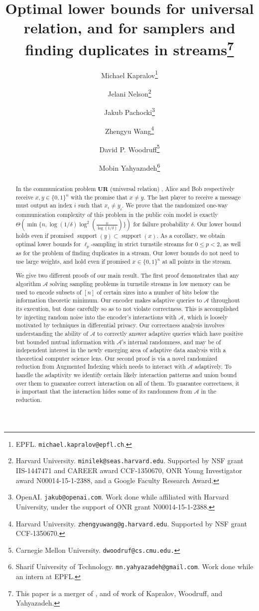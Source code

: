 \documentclass[11pt]{article}
\title{Optimal lower bounds for universal relation, and for samplers and finding duplicates in streams\footnote{This paper is a merger of \cite{NelsonPW17},
    and of work of Kapralov, Woodruff, and Yahyazadeh.}}
\author{
  Michael Kapralov\thanks{EPFL. \texttt{michael.kapralov@epfl.ch}.}
  \and Jelani Nelson\thanks{Harvard University. \texttt{minilek@seas.harvard.edu}. Supported by NSF grant IIS-1447471 and
   CAREER award CCF-1350670, ONR Young Investigator award N00014-15-1-2388, and a Google Faculty Research Award.}
  \and Jakub Pachocki\thanks{OpenAI. \texttt{jakub@openai.com}. Work done while affiliated with Harvard University, under the support of ONR grant N00014-15-1-2388.}
  \and Zhengyu Wang\thanks{Harvard University. \texttt{zhengyuwang@g.harvard.edu}. Supported by NSF grant CCF-1350670.}
  \and David P. Woodruff\thanks{Carnegie Mellon University. \texttt{dwoodruf@cs.cmu.edu.}}
  \and Mobin Yahyazadeh\thanks{Sharif University of Technology. \texttt{mn.yahyazadeh@gmail.com}. Work done while an intern at EPFL.}}
\newcommand{\ur}{\mathbf{UR}\xspace}
\begin{document}
\setcounter{page}{0}

\maketitle

\thispagestyle{empty}

\begin{abstract}
In the communication problem $\ur$ (universal relation) \cite{KarchmerRW95}, Alice and Bob respectively receive $x, y \in\{0,1\}^n$ with the promise that $x\neq y$. The last player to receive a message must output an index $i$ such that $x_i\neq y_i$. We prove that the randomized one-way communication complexity of this problem in the public coin model is exactly $\Theta(\min\{n,\log(1/\delta)\log^2(\frac n{\log(1/\delta)})\})$ for failure probability $\delta$. Our lower bound holds even if promised $\mathop{support}(y)\subset \mathop{support}(x)$. As a corollary, we obtain optimal lower bounds for $\ell_p$-sampling in strict turnstile streams for $0\le p < 2$, as well as for the problem of finding duplicates in a stream. Our lower bounds do not need to use large weights, and hold even if promised $x\in\{0,1\}^n$ at all points in the stream. 

We give two different proofs of our main result. The first proof demonstrates that any algorithm $\mathcal A$ solving sampling problems in turnstile streams in low memory can be used to encode subsets of $[n]$ of certain sizes into a number of bits below the information theoretic minimum. Our encoder makes adaptive queries to $\mathcal A$ throughout its execution, but done carefully so as to not violate correctness. This is accomplished by injecting random noise into the encoder's interactions with $\mathcal A$, which is loosely motivated by techniques in differential privacy. Our correctness analysis involves understanding the ability of $\mathcal A$ to correctly answer adaptive queries which have positive but bounded mutual information with $\mathcal A$'s internal randomness, and may be of independent interest in the newly emerging area of adaptive data analysis with a theoretical computer science lens. Our second proof is via a novel randomized reduction from Augmented Indexing \cite{MiltersenNSW98} which needs to interact with $\mathcal A$ adaptively. To handle the adaptivity we identify certain likely interaction patterns and union bound over them to guarantee correct interaction on all of them. To guarantee correctness, it is important that the interaction hides some of its randomness from $\mathcal A$ in the reduction.


\end{abstract}
\end{document}
